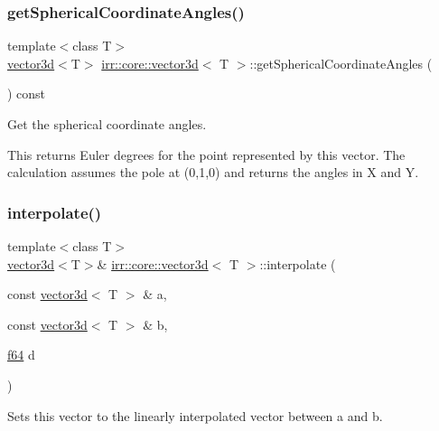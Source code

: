 \subsubsection{\texorpdfstring{get\+Spherical\+Coordinate\+Angles()}{getSphericalCoordinateAngles()}}
{\footnotesize\ttfamily template$<$class T$>$ \\
\hyperlink{classirr_1_1core_1_1vector3d}{vector3d}$<$T$>$ \hyperlink{classirr_1_1core_1_1vector3d}{irr\+::core\+::vector3d}$<$ T $>$\+::get\+Spherical\+Coordinate\+Angles (\begin{DoxyParamCaption}{ }\end{DoxyParamCaption}) const\hspace{0.3cm}{\ttfamily [inline]}}



Get the spherical coordinate angles. 

This returns Euler degrees for the point represented by this vector. The calculation assumes the pole at (0,1,0) and returns the angles in X and Y. \mbox{\label{classirr_1_1core_1_1vector3d_a32a888e0f608a20deee98c794a321c4c}} 
\subsubsection{\texorpdfstring{interpolate()}{interpolate()}}
{\footnotesize\ttfamily template$<$class T$>$ \\
\hyperlink{classirr_1_1core_1_1vector3d}{vector3d}$<$T$>$\& \hyperlink{classirr_1_1core_1_1vector3d}{irr\+::core\+::vector3d}$<$ T $>$\+::interpolate (\begin{DoxyParamCaption}\item[{const \hyperlink{classirr_1_1core_1_1vector3d}{vector3d}$<$ T $>$ \&}]{a,  }\item[{const \hyperlink{classirr_1_1core_1_1vector3d}{vector3d}$<$ T $>$ \&}]{b,  }\item[{\hyperlink{namespaceirr_a1325b02603ad449f92c68fc640af9b28}{f64}}]{d }\end{DoxyParamCaption})\hspace{0.3cm}{\ttfamily [inline]}}



Sets this vector to the linearly interpolated vector between a and b. 


